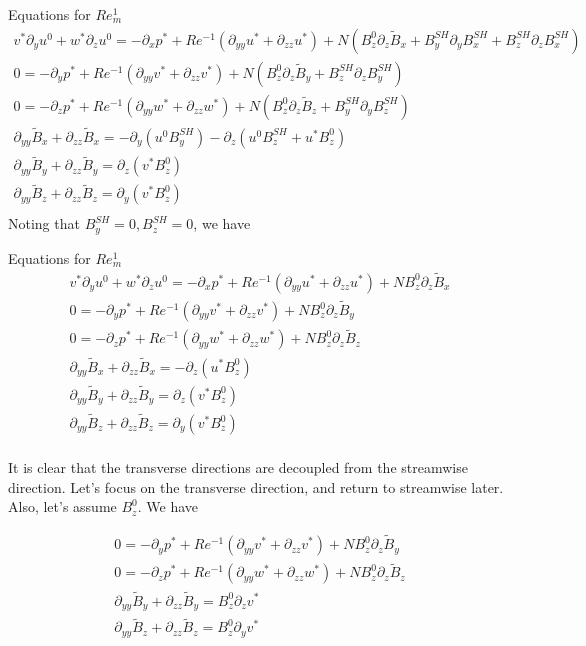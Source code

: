 \documentclass[11pt]{article}
\newcommand{\BS}{B^{SH}}
\newcommand{\BT}{\tilde{B}}
\newcommand{\PD}{\partial}
\begin{document}
Equations for $Re_m^1$
\begin{equation}\begin{aligned}
v^* \PD_y u^0 + w^* \PD_z u^0 = -\PD_x p^*+ Re^{-1} (\PD_{yy} u^* + \PD_{zz} u^*) + N ( B_z^0 \PD_z \BT_x + \BS_y \PD_y \BS_x + \BS_z \PD_z \BS_x ) \\
0 = -\PD_y p^*+ Re^{-1} (\PD_{yy} v^* + \PD_{zz} v^*) + N ( B_z^0 \PD_z \BT_y + \BS_z \PD_z \BS_y ) \\
0 = -\PD_z p^*+ Re^{-1} (\PD_{yy} w^* + \PD_{zz} w^*) + N ( B_z^0 \PD_z \BT_z + \BS_y \PD_y \BS_z) \\
\PD_{yy} \BT_x + \PD_{zz} \BT_x =-\PD_y ( u^0 \BS_y) - \PD_z ( u^0 \BS_z + u^* B_z^0) \\
\PD_{yy} \BT_y + \PD_{zz} \BT_y = \PD_z ( v^* B_z^0 ) \\
\PD_{yy} \BT_z + \PD_{zz} \BT_z = \PD_y ( v^* B_z^0 ) \\
\end{aligned}\end{equation}
Noting that $\BS_y = 0, \BS_z = 0$, we have

Equations for $Re_m^1$
\begin{equation}\begin{aligned}
v^* \PD_y u^0 + w^* \PD_z u^0 = -\PD_x p^*+ Re^{-1} (\PD_{yy} u^* + \PD_{zz} u^*) + N B_z^0 \PD_z \BT_x \\
0 = -\PD_y p^*+ Re^{-1} (\PD_{yy} v^* + \PD_{zz} v^*) + N B_z^0 \PD_z \BT_y \\
0 = -\PD_z p^*+ Re^{-1} (\PD_{yy} w^* + \PD_{zz} w^*) + N B_z^0 \PD_z \BT_z \\
\PD_{yy} \BT_x + \PD_{zz} \BT_x =-\PD_z ( u^* B_z^0 ) \\
\PD_{yy} \BT_y + \PD_{zz} \BT_y = \PD_z ( v^* B_z^0 ) \\
\PD_{yy} \BT_z + \PD_{zz} \BT_z = \PD_y ( v^* B_z^0 ) \\
\end{aligned}\end{equation}

It is clear that the transverse directions are decoupled from the streamwise direction.
Let's focus on the transverse direction, and return to streamwise later. Also, let's assume $B_z^0$. We have

\begin{equation}\begin{aligned}
0 = -\PD_y p^*+ Re^{-1} (\PD_{yy} v^* + \PD_{zz} v^*) + N B_z^0 \PD_z \BT_y \\
0 = -\PD_z p^*+ Re^{-1} (\PD_{yy} w^* + \PD_{zz} w^*) + N B_z^0 \PD_z \BT_z \\
\PD_{yy} \BT_y + \PD_{zz} \BT_y = B_z^0 \PD_z v^* \\
\PD_{yy} \BT_z + \PD_{zz} \BT_z = B_z^0 \PD_y v^* \\
\end{aligned}\end{equation}
\end{document}
